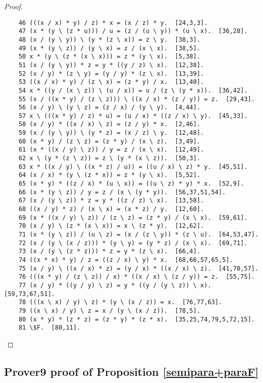 \documentclass[12pt, twoside, openright]{report}
\theoremstyle{definition}
\begin{document}
\begin{proof}
\begin{lstlisting}
    46 (((x / x) * y) / z) * x = (x / z) * y.  [24,3,3].
    47 (x * (y \ (z * u))) / u = (z / (u \ y)) * (u \ x).  [36,28].
    48 (x / (y \ y)) \ (y * (z \ x)) = z \ y.  [38,3].
    49 (x * (y \ z)) / (y \ x) = z / (x \ x).  [38,5].
    50 x * (y \ (z * (x \ x))) = z * (y \ x).  [5,38].
    51 (x / (y \ y)) * z = y * ((y / z) \ x).  [12,38].
    52 (x / y) * (z \ y) = (y / y) * (z \ x).  [13,39].
    53 ((x / x) * y) / (z \ x) = (z * y) / x.  [13,40].
    54 x * ((y / (x \ z)) \ (u / x)) = u / (z \ (y * x)).  [36,42].
    55 (x / ((x * y) / (z \ z))) \ ((x / x) * (z / y)) = z.  [29,43].
    56 (x / y) \ (y \ z) = (z / x) / (y \ y).  [4,44].
    57 x \ (((x * y) / z) * u) = (u / x) * ((z / x) \ y).  [45,33].
    58 (x / y) * ((x / x) \ z) = (z / y) * x.  [2,46].
    59 (x / (y \ y)) \ (y * z) = (x / z) \ y.  [12,48].
    60 (x * y) / (z \ z) = (z * y) / (x \ z).  [3,49].
    61 (x * ((x / y) \ z)) / y = z / (x \ x).  [12,49].
    62 x \ (y * (z \ z)) = z \ (y * (x \ z)).  [50,3].
    63 x * ((x / y) \ ((x * z) / u)) = ((u / x) \ z) * y.  [45,51].
    64 (x / x) * (y \ (z * x)) = z * (y \ x).  [5,52].
    65 (x * y) * ((z / x) * (u \ x)) = ((u \ z) * y) * x.  [52,9].
    66 (x * (y \ z)) / y = z / (x \ (y * y)).  [56,37,51,54].
    67 (x / (y \ z)) * z = y * ((z / z) \ x).  [13,58].
    68 ((x / y) * z) / (x \ x) = (x * z) / y.  [12,60].
    69 (x * ((x / y) \ z)) / (z \ z) = (z * y) / (x \ x).  [59,61].
    70 (x / y) \ (z * (x \ x)) = x \ (z * y).  [12,62].
    71 (x * (y \ z)) / (u \ z) = (x / (z \ y)) * (z \ u).  [64,53,47].
    72 (x / (y \ (x / z))) * (y \ y) = (y * z) / (x \ x).  [69,71].
    73 (x / (y \ (z * z))) * z = y * (z \ x).  [66,4].
    74 ((x * x) * y) / z = ((z / x) \ y) * x.  [68,66,57,65,5].
    75 (x / y) \ ((x / x) * z) = (y / x) * ((x / x) \ z).  [41,70,57].
    76 (((x * y) / (z \ z)) / x) * ((x / x) \ (z / y)) = z.  [55,75].
    77 (x / y) * ((y / y) \ z) = y * ((y / (y \ z)) \ x).  [59,73,67,51].
    78 (((x \ x) / y) \ z) * (y \ (x / z)) = x.  [76,77,63].
    79 ((x \ x) / y) \ z = x / (y \ (x / z)).  [78,5].
    80 (x * y) * (z * z) = (z * y) * (z * x).  [35,25,74,79,5,72,15].
    81 \$F.  [80,11].
  \end{lstlisting}
\end{proof}

\subsection{Prover9 proof of Proposition \ref{semipara+paraF}}
\end{document}
